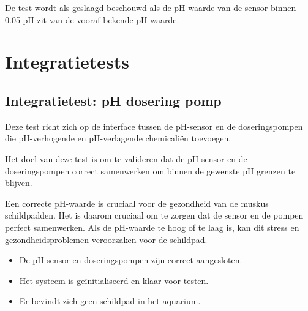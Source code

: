 \documentclass[a4paper]{report}
\begin{document}
\begin{tcolorbox}[colback=white, colframe=black, title=Slagingscriteria]
De test wordt als geslaagd beschouwd als de pH-waarde van de sensor binnen 0.05 pH zit van de vooraf bekende pH-waarde.
\end{tcolorbox}


\section{Integratietests}
\subsection{Integratietest: pH dosering pomp}
\begin{tcolorbox}[colback=white, colframe=black, title=Beschrijving van de interface]
  Deze test richt zich op de interface tussen de pH-sensor en de doseringspompen die pH-verhogende en pH-verlagende chemicaliën toevoegen.
\end{tcolorbox}

\begin{tcolorbox}[colback=white, colframe=black, title=Test Doel]
  Het doel van deze test is om te valideren dat de pH-sensor en de doseringspompen correct samenwerken om binnen de gewenste pH grenzen te blijven.
\end{tcolorbox}

\begin{tcolorbox}[colback=white, colframe=black, title=Test Motivatie]
  Een correcte pH-waarde is cruciaal voor de gezondheid van de muskus schildpadden. Het is daarom cruciaal om te zorgen dat de sensor en de pompen perfect samenwerken.
  Als de pH-waarde te hoog of te laag is, kan dit stress en gezondheidsproblemen veroorzaken voor de schildpad.
\end{tcolorbox}

\begin{tcolorbox}[colback=white, colframe=black, title=Test Criteria]
  \begin{itemize}
    \item De pH-sensor en doseringspompen zijn correct aangesloten.
    \item Het systeem is geïnitialiseerd en klaar voor testen.
    \item Er bevindt zich geen schildpad in het aquarium.
  \end{itemize}
\end{tcolorbox}
\end{document}
